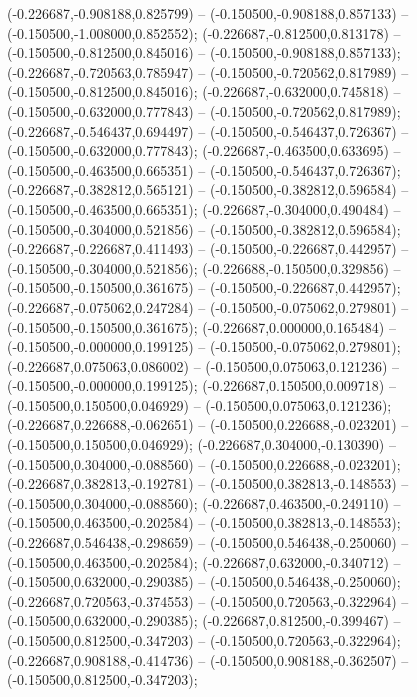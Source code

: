  (-0.226687,-0.908188,0.825799) -- (-0.150500,-0.908188,0.857133) -- (-0.150500,-1.008000,0.852552);
 (-0.226687,-0.812500,0.813178) -- (-0.150500,-0.812500,0.845016) -- (-0.150500,-0.908188,0.857133);
 (-0.226687,-0.720563,0.785947) -- (-0.150500,-0.720562,0.817989) -- (-0.150500,-0.812500,0.845016);
 (-0.226687,-0.632000,0.745818) -- (-0.150500,-0.632000,0.777843) -- (-0.150500,-0.720562,0.817989);
 (-0.226687,-0.546437,0.694497) -- (-0.150500,-0.546437,0.726367) -- (-0.150500,-0.632000,0.777843);
 (-0.226687,-0.463500,0.633695) -- (-0.150500,-0.463500,0.665351) -- (-0.150500,-0.546437,0.726367);
 (-0.226687,-0.382812,0.565121) -- (-0.150500,-0.382812,0.596584) -- (-0.150500,-0.463500,0.665351);
 (-0.226687,-0.304000,0.490484) -- (-0.150500,-0.304000,0.521856) -- (-0.150500,-0.382812,0.596584);
 (-0.226687,-0.226687,0.411493) -- (-0.150500,-0.226687,0.442957) -- (-0.150500,-0.304000,0.521856);
 (-0.226688,-0.150500,0.329856) -- (-0.150500,-0.150500,0.361675) -- (-0.150500,-0.226687,0.442957);
 (-0.226687,-0.075062,0.247284) -- (-0.150500,-0.075062,0.279801) -- (-0.150500,-0.150500,0.361675);
 (-0.226687,0.000000,0.165484) -- (-0.150500,-0.000000,0.199125) -- (-0.150500,-0.075062,0.279801);
 (-0.226687,0.075063,0.086002) -- (-0.150500,0.075063,0.121236) -- (-0.150500,-0.000000,0.199125);
 (-0.226687,0.150500,0.009718) -- (-0.150500,0.150500,0.046929) -- (-0.150500,0.075063,0.121236);
 (-0.226687,0.226688,-0.062651) -- (-0.150500,0.226688,-0.023201) -- (-0.150500,0.150500,0.046929);
 (-0.226687,0.304000,-0.130390) -- (-0.150500,0.304000,-0.088560) -- (-0.150500,0.226688,-0.023201);
 (-0.226687,0.382813,-0.192781) -- (-0.150500,0.382813,-0.148553) -- (-0.150500,0.304000,-0.088560);
 (-0.226687,0.463500,-0.249110) -- (-0.150500,0.463500,-0.202584) -- (-0.150500,0.382813,-0.148553);
 (-0.226687,0.546438,-0.298659) -- (-0.150500,0.546438,-0.250060) -- (-0.150500,0.463500,-0.202584);
 (-0.226687,0.632000,-0.340712) -- (-0.150500,0.632000,-0.290385) -- (-0.150500,0.546438,-0.250060);
 (-0.226687,0.720563,-0.374553) -- (-0.150500,0.720563,-0.322964) -- (-0.150500,0.632000,-0.290385);
 (-0.226687,0.812500,-0.399467) -- (-0.150500,0.812500,-0.347203) -- (-0.150500,0.720563,-0.322964);
 (-0.226687,0.908188,-0.414736) -- (-0.150500,0.908188,-0.362507) -- (-0.150500,0.812500,-0.347203);
